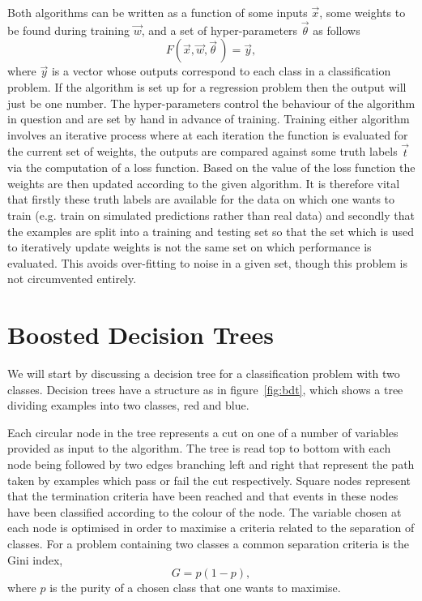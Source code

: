 Both algorithms can be written as a function of some inputs $\vec{x}$, some
weights to be found during training $\vec{w}$, and a set of hyper-parameters
$\vec{\theta}$ as follows
\begin{equation}
  F(\vec{x}, \vec{w}, \vec{\theta} \,) = \vec{y},
  \label{eq:ml-general}
\end{equation}
where $\vec{y}$ is a vector whose outputs correspond to each class in a
classification problem. If the algorithm is set up for a regression problem then
the output will just be one number. The hyper-parameters control the behaviour
of the algorithm in question and are set by hand in advance of training.
Training either algorithm involves an iterative process where at each iteration
the function is evaluated for the current set of weights, the outputs are
compared against some truth labels $\vec{t}$ via the computation of a loss
function. Based on the value of the loss function the weights are then updated
according to the given algorithm. It is therefore vital that firstly these truth
labels are available for the data on which one wants to train (e.g. train on
simulated predictions rather than real data) and secondly that the examples are
split into a training and testing set so that the set which is used to
iteratively update weights is not the same set on which performance is
evaluated. This avoids over-fitting to noise in a given set, though this
problem is not circumvented entirely.

\section{Boosted Decision Trees}%
\label{sec:bdts}
We will start by discussing a decision tree for a classification problem with
two classes. Decision trees have a structure as in figure~\ref{fig:bdt}, which
shows a tree dividing examples into two classes, red and blue.

Each circular node in the tree represents a cut on one of a number of variables
provided as input to the algorithm. The tree is read top to bottom with each
node being followed by two edges branching left and right that represent the
path taken by examples which pass or fail the cut respectively. Square nodes
represent that the termination criteria have been reached and that events in
these nodes have been classified according to the colour of the node. The
variable chosen at each node is optimised in order to maximise a criteria
related to the separation of classes.  For a problem containing two classes a
common separation criteria is the Gini index,
\begin{equation}
  G = p(1-p),
  \label{eq:gini}
\end{equation}
where $p$ is the purity of a chosen class that one wants to maximise.

